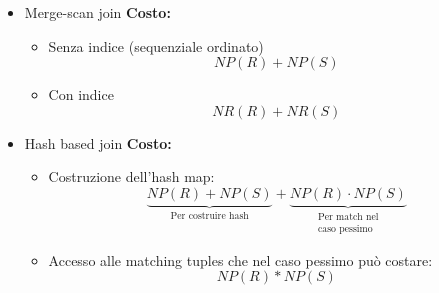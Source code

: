 \documentclass[a4paper]{article}
\begin{document}
\begin{enumerate}
\begin{itemize}
\begin{itemize}
          \item Con indice:
            \[
              NP(R) + NR(R) \cdot \left( ProfonditaIndice + \frac{NR(S)}{VAL(A,S)} \right) 
            \]
        \end{itemize}

      \item Merge-scan join \textbf{Costo: }
        \begin{itemize}
          \item Senza indice (sequenziale ordinato)
            \[
              NP(R) + NP(S)
            \] 

          \item Con indice
            \[
              NR(R) + NR(S)
            \] 
        \end{itemize}

      \item Hash based join \textbf{Costo: }
        \begin{itemize}
          \item Costruzione dell'hash map:
            \[
              \underbrace{NP(R) + NP(S)}_{\text{Per costruire hash}}
              +
              \underbrace{NP(R) \cdot NP(S)}_{\substack{\text{Per match nel}\\\text{caso pessimo}}}
            \] 

          \item Accesso alle matching tuples che nel caso pessimo può costare:
            \[
              NP(R) * NP(S)
            \]
        \end{itemize}
    \end{itemize}
\end{enumerate}
\end{document}
